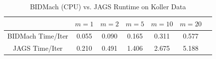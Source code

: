 \documentclass{article} %
\begin{document}
%
%
%
%
%
%
%
%
\begin{table}[t]
\caption{BIDMach (CPU) vs. JAGS Runtime on Koller Data}
\label{tab:bidmach_jags_koller}
\begin{center}
\begin{tabular}{ |c|c|c|c|c|c|c| } 
\hline
                  & $m=1$ & $m=2$ & $m=5$ & $m=10$ & $m=20$ \\
\hline \hline
BIDMach Time/Iter & 0.055 & 0.090 & 0.165 & 0.311  & 0.577  \\ 
JAGS Time/Iter    & 0.210 & 0.491 & 1.406 & 2.675  & 5.188  \\
\hline
\end{tabular}
\end{center}
\end{table}
\end{document}
